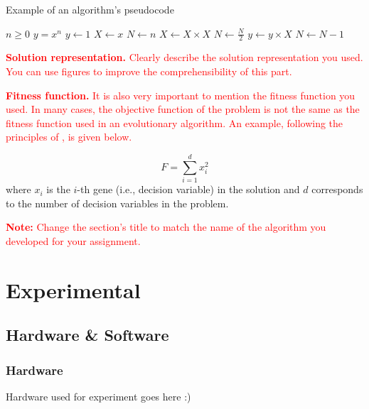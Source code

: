 \documentclass{scrartcl}
\begin{document}
\begin{algorithm}
\caption{Example of an algorithm's pseudocode}\label{alg:pseudocode_example}
\begin{algorithmic}
\Require $n \geq 0$
\Ensure $y = x^n$
\State $y \gets 1$
\State $X \gets x$
\State $N \gets n$
    \State $X \gets X \times X$
    \State $N \gets \frac{N}{2}$  
    \State $y \gets y \times X$
    \State $N \gets N - 1$
\EndIf
\EndWhile
\end{algorithmic}
\end{algorithm}

\textcolor{red}{\textbf{Solution representation.} Clearly describe the solution representation you used. You can use figures to improve the comprehensibility of this part.}

\textcolor{red}{\textbf{Fitness function.} It is also very important to mention the fitness function you used. In many cases, the objective function of the problem is not the same as the fitness function used in an evolutionary algorithm. An example, following the principles of \cite{zobel2014mathematics}, is given below.}

\begin{equation}
    F = \sum_{i=1}^d x_i^2 
\end{equation}
where $x_i$ is the $i$-th gene (i.e., decision variable) in the solution and $d$ corresponds to the number of decision variables in the problem.

\textcolor{red}{\textbf{Note:} Change the section's title to match the name of the algorithm you developed for your assignment.}

\lipsum[3]

\section{Experimental}
\subsection{Hardware \& Software}
\subsubsection{Hardware}
Hardware used for experiment goes here :)
\end{document}
